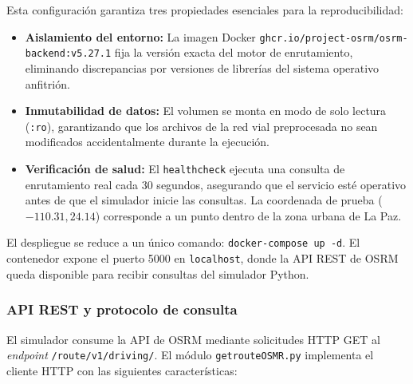 \documentclass[12pt,letterpaper,oneside]{book}
\begin{document}
	Esta configuración garantiza tres propiedades esenciales para la reproducibilidad:

	\begin{itemize}
		\item \textbf{Aislamiento del entorno:} La imagen Docker \texttt{ghcr.io/project-osrm/osrm-backend:v5.27.1} fija 
		la versión exacta del motor de enrutamiento, eliminando discrepancias por versiones de librerías 
		del sistema operativo anfitrión.
		
		\item \textbf{Inmutabilidad de datos:} El volumen se monta en modo de solo lectura (\texttt{:ro}), 
		garantizando que los archivos de la red vial preprocesada no sean modificados accidentalmente 
		durante la ejecución.
		
		\item \textbf{Verificación de salud:} El \texttt{healthcheck} ejecuta una consulta de enrutamiento 
		real cada 30 segundos, asegurando que el servicio esté operativo antes de que el simulador inicie 
		las consultas. La coordenada de prueba ($-110.31, 24.14$) corresponde a un punto dentro de la 
		zona urbana de La Paz.
	\end{itemize}

	El despliegue se reduce a un único comando: \texttt{docker-compose up -d}. El contenedor expone el 
	puerto 5000 en \texttt{localhost}, donde la API REST de OSRM queda disponible para recibir consultas 
	del simulador Python.

	\subsubsection{API REST y protocolo de consulta}

	El simulador consume la API de OSRM mediante solicitudes HTTP GET al \textit{endpoint} 
	\texttt{/route/v1/driving/}. El módulo \texttt{getrouteOSMR.py} implementa el cliente HTTP con las 
	siguientes características:
\end{document}
